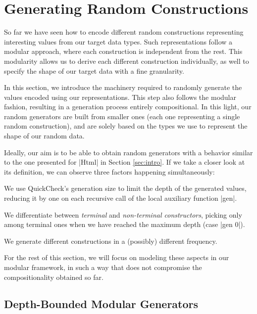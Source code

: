 \section{Generating Random Constructions}
\label{sec:generators}

%
So far we have seen how to encode different random constructions representing
interesting values from our target data types.
%
Such representations follow a modular approach, where each construction is
independent from the rest.
%
This modularity allows us to derive each different construction individually, as
well to specify the shape of our target data with a fine granularity.


In this section, we introduce the machinery required to randomly generate the
values encoded using our representations.
%
This step also follows the modular fashion, resulting in a generation process
entirely compositional.
%
In this light, our random generators are built from smaller ones (each one
representing a single random construction), and are solely based on the types we
use to represent the shape of our random data.


Ideally, our aim is to be able to obtain random generators with a behavior
similar to the one presented for |Html| in Section \ref{sec:intro}.
%
If we take a closer look at its definition, we can observe three factors
happening simultaneously:
%
\vspace{2pt}
\begin{CompactItemize}
\item We use QuickCheck's generation size to limit the depth of the generated
  values, reducing it by one on each recursive call of the local auxiliary
  function |gen|.
\item We differentiate between \emph{terminal} and \emph{non-terminal
    constructors}, picking only among terminal ones when we have reached the
  maximum depth (case |gen 0|).
\item We generate different constructions in a (possibly) different frequency.
\end{CompactItemize}
%
For the rest of this section, we will focus on modeling these aspects in our
modular framework, in such a way that does not compromise the compositionality
obtained so far.


%
\subsection{Depth-Bounded Modular Generators}

